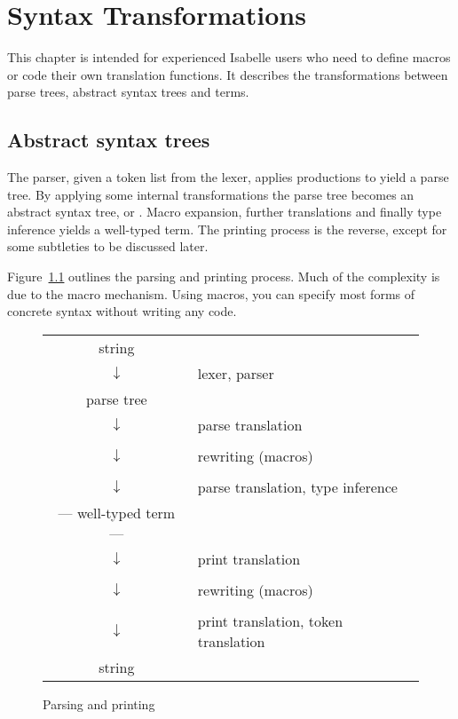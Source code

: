 \chapter{Syntax Transformations} \label{chap:syntax}
\newcommand\ttapp{\mathrel{\hbox{\tt\$}}}
\newcommand\mtt[1]{\mbox{\tt #1}}
\newcommand\ttfct[1]{\mathop{\mtt{#1}}\nolimits}
\newcommand\Constant{\ttfct{Constant}}
\newcommand\Variable{\ttfct{Variable}}
\newcommand\Appl[1]{\ttfct{Appl}\,[#1]}

This chapter is intended for experienced Isabelle users who need to define
macros or code their own translation functions.  It describes the
transformations between parse trees, abstract syntax trees and terms.


\section{Abstract syntax trees} \label{sec:asts}

The parser, given a token list from the lexer, applies productions to yield
a parse tree.  By applying some internal transformations
the parse tree becomes an abstract syntax tree, or \AST{}.  Macro
expansion, further translations and finally type inference yields a
well-typed term.  The printing process is the reverse, except for some
subtleties to be discussed later.

Figure~\ref{fig:parse_print} outlines the parsing and printing process.
Much of the complexity is due to the macro mechanism.  Using macros, you
can specify most forms of concrete syntax without writing any \ML{} code.

\begin{figure}
\begin{center}
\begin{tabular}{cl}
string          & \\
$\downarrow$    & lexer, parser \\
parse tree      & \\
$\downarrow$    & parse \AST{} translation \\
\AST{}             & \\
$\downarrow$    & \AST{} rewriting (macros) \\
\AST{}             & \\
$\downarrow$    & parse translation, type inference \\
--- well-typed term --- & \\
$\downarrow$    & print translation \\
\AST{}             & \\
$\downarrow$    & \AST{} rewriting (macros) \\
\AST{}             & \\
$\downarrow$    & print \AST{} translation, token translation \\
string          &
\end{tabular}

\end{center}
\caption{Parsing and printing}\label{fig:parse_print}
\end{figure}

